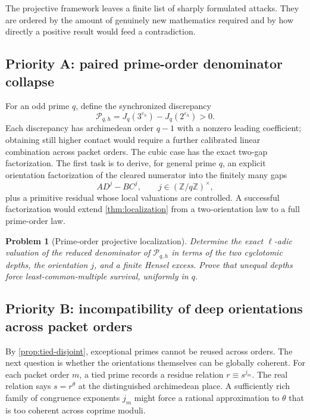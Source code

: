 \documentclass[11pt]{article}
\newtheorem{problem}[theorem]{Problem}
\theoremstyle{definition}
\theoremstyle{remark}
\newcommand{\Z}{\mathbb{Z}}
\newcommand{\eps}{\varepsilon}
\begin{document}
The projective framework leaves a finite list of sharply formulated attacks.  They are ordered by the amount of genuinely new mathematics required and by how directly a positive result would feed a contradiction.

\subsection{Priority A: paired prime-order denominator collapse}

For an odd prime $q$, define the synchronized discrepancy
\begin{equation}\label{eq:Pqh}
 \mathscr P_{q,h}=J_q(3^{\eps_h})-J_q(2^{\eps_h})>0.
\end{equation}
Each discrepancy has archimedean order $q-1$ with a nonzero leading coefficient; obtaining still higher contact would require a further calibrated linear combination across packet orders.  The cubic case has the exact two-gap factorization.  The first task is to derive, for general prime $q$, an explicit orientation factorization of the cleared numerator into the finitely many gaps
\begin{equation}\label{eq:q-orientation-gaps}
 A D^j-B C^j,
 \qquad j\in(\Z/q\Z)^\times,
\end{equation}
plus a primitive residual whose local valuations are controlled.  A successful factorization would extend \cref{thm:localization} from a two-orientation law to a full prime-order law.

\begin{problem}[Prime-order projective localization]\label{prob:prime-localization}
Determine the exact $\ell$-adic valuation of the reduced denominator of $\mathscr P_{q,h}$ in terms of the two cyclotomic depths, the orientation $j$, and a finite Hensel excess.  Prove that unequal depths force least-common-multiple survival, uniformly in $q$.
\end{problem}

\subsection{Priority B: incompatibility of deep orientations across packet orders}

By \cref{prop:tied-disjoint}, exceptional primes cannot be reused across orders.  The next question is whether the orientations themselves can be globally coherent.  For each packet order $m$, a tied prime records a residue relation $r\equiv s^{j_m}$.  The real relation says $s=r^\theta$ at the distinguished archimedean place.  A sufficiently rich family of congruence exponents $j_m$ might force a rational approximation to $\theta$ that is too coherent across coprime moduli.
\end{document}
